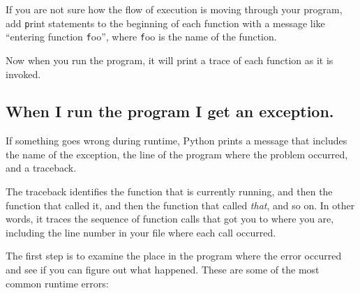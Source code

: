 \documentclass[
DIV=11,
fontsize=12,
twoside,
headinclude=false,
titlepage=firstiscover,
abstract=true,
headsepline=true,
footsepline=true,
chapterprefix=true, %
headings=big,
bibliography=totoc,%
captions=tableheading
]{scrbook}
\theoremstyle{definition}
\begin{document}
If you are not sure how the flow of execution is moving through
your program, add {\texttt print} statements to the beginning of each
function with a message like ``entering function {\texttt foo}'', where
{\texttt foo} is the name of the function.

Now when you run the program, it will print a trace of each
function as it is invoked.


\subsection{When I run the program I get an exception.}

If something goes wrong during runtime, Python
prints a message that includes the name of the
exception, the line of the program where the problem occurred,
and a traceback.

The traceback identifies the function that is currently running, and
then the function that called it, and then the function that called
{\em that}, and so on.  In other words, it traces the sequence of
function calls that got you to where you are, including the line
number in your file where each call occurred.

The first step is to examine the place in the program where
the error occurred and see if you can figure out what happened.
These are some of the most common runtime errors:
\end{document}
